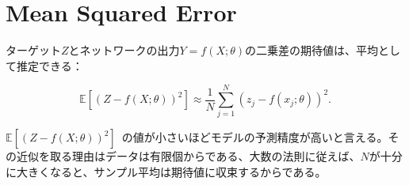 \documentclass[dvipdfmx,a4paper]{jsarticle}%
\begin{document}
\maketitle
\section{\textbf{Mean Squared Error}}
\thispagestyle{plain}
\begin{dfn}\label{def:cross-entropy}
ターゲット$Z$とネットワークの出力$Y = f(X; \theta)$の二乗差の期待値は、平均として推定できる：

$$\mathbb{E}[(Z - f(X; \theta))^2] \approx \frac{1}{N} \sum_{j=1}^{N} (z_j - f(x_j; \theta))^2.$$

\noindent
$\mathbb{E}[(Z - f(X; \theta))^2]$\ の値が小さいほどモデルの予測精度が高いと言える。その近似を取る理由はデータは有限個からである、大数の法則に従えば、$N$が十分に大きくなると、サンプル平均は期待値に収束するからである。

\end{dfn}
\end{document}
